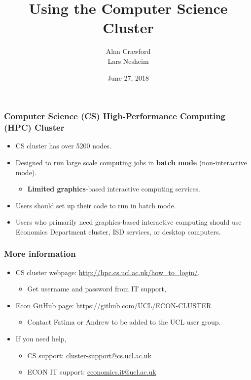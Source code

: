 \documentclass{beamer}
\title{Using the Computer Science Cluster}
\author{Alan Crawford \\
           Lars Nesheim}
\date{June 27, 2018}
\begin{document}
\lstset{language=Pascal}
\frame{\titlepage}


\begin{frame}
\frametitle{Computer Science (CS) High-Performance Computing (HPC) Cluster}

\begin{itemize}
\item CS cluster has over 5200 nodes.
\item Designed to run large scale computing jobs in \textbf{batch mode} (non-interactive mode).
\begin{itemize}
\item \textbf{Limited graphics}-based interactive computing services. 
\end{itemize}
\item Users should set up their code to run in batch mode.
\item Users who primarily need graphics-based interactive computing should use Economics Department cluster, ISD services, or desktop computers. 
\end{itemize}
\end{frame}

\begin{frame}
\frametitle{More information}
\begin{itemize}
\item CS cluster webpage: \textcolor{blue}{\url{http://hpc.cs.ucl.ac.uk/how_to_login/}}.
\begin{itemize}
\item Get username and password from IT support,
\end{itemize}
\item Econ GitHub page: \textcolor{blue}{\url{https://github.com/UCL/ECON-CLUSTER}}
\begin{itemize}
\item Contact Fatima or Andrew to be added to the UCL user group.
\end{itemize}
\item If you need help, 
\begin{itemize}
\item CS support: \textcolor{blue}{\url{cluster-support@cs.ucl.ac.uk}}
\item ECON IT support:  \textcolor{blue}{\url{economics.it@ucl.ac.uk}}
\end{itemize}
\end{itemize}
\end{frame}
\end{document}
